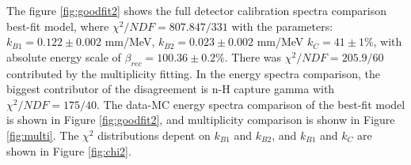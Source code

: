 The figure \ref{fig:goodfit2} shows the full detector calibration spectra comparison best-fit model, where $\chi^2/NDF = 807.847/331$ with the parameters: $k_{B1} = 0.122 \pm 0.002$ mm/MeV, $k_{B2} = 0.023 \pm 0.002$ mm/MeV $k_C = 41 \pm 1\%$, with absolute energy scale of $\beta_{rec} = 100.36\pm0.2\%$. 
There was $\chi^2/NDF = 205.9/60$ contributed by the multiplicity fitting.
In the energy spectra comparison, the biggest contributor of the disagreement is n-H capture gamma with $\chi^2/NDF = 175/40$.
The data-MC energy spectra comparison of the best-fit model is shown in Figure \ref{fig:goodfit2}, and multiplicity comparison is shonw in Figure \ref{fig:multi}.
The $\chi^2$ distributions depent on $k_{B1}$ and $k_{B2}$, and $k_{B1}$ and $k_{C}$ are shown in Figure \ref{fig:chi2}.

\begin{figure}[h!]
\centering
{}\quad
{} \\
 \quad

\end{figure}
